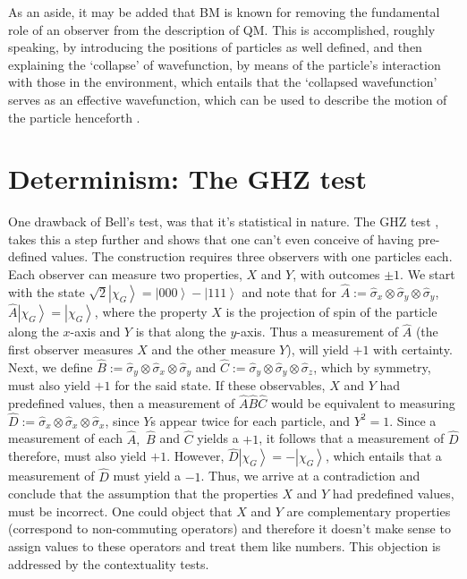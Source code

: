 As an aside, it may be added that BM is known for removing the fundamental
role of an observer from the description of QM. This is accomplished,
roughly speaking, by introducing the positions of particles as well
defined, and then explaining the `collapse' of wavefunction, by means
of the particle's interaction with those in the environment, which
entails that the `collapsed wavefunction' serves as an effective wavefunction,
which can be used to describe the motion of the particle henceforth
\cite{Bohm2,Detlef}.


\section{Determinism: The GHZ test\label{sec:Determinism-The-GHZ}}

One drawback of Bell's test, was that it's statistical in nature.
The GHZ test \cite{GHZ}, takes this a step further and shows that
one can't even conceive of having pre-defined values. The construction
requires three observers with one particles each. Each observer can
measure two properties, $X$ and $Y$, with outcomes $\pm1$. We start
with the state $\sqrt{2}\left|\chi_{G}\right\rangle =\left|000\right\rangle -\left|111\right\rangle $
and note that for $\hat{A}:=\hat{\sigma}_{x}\otimes\hat{\sigma}_{y}\otimes\hat{\sigma}_{y}$,
$\hat{A}\left|\chi_{G}\right\rangle =\left|\chi_{G}\right\rangle $,
where the property $X$ is the projection of spin of the particle
along the $x$-axis and $Y$ is that along the $y$-axis. Thus a measurement
of $\hat{A}$ (the first observer measures $X$ and the other measure
$Y$), will yield $+1$ with certainty. Next, we define $\hat{B}:=\hat{\sigma}_{y}\otimes\hat{\sigma}_{x}\otimes\hat{\sigma}_{y}$
and $\hat{C}:=\hat{\sigma}_{y}\otimes\hat{\sigma}_{y}\otimes\hat{\sigma}_{z}$,
which by symmetry, must also yield $+1$ for the said state. If these
observables, $X$ and $Y$ had predefined values, then a measurement
of $\hat{A}\hat{B}\hat{C}$ would be equivalent to measuring $\hat{D}:=\hat{\sigma}_{x}\otimes\hat{\sigma}_{x}\otimes\hat{\sigma}_{x}$,
since $Y$s appear twice for each particle, and $Y^{2}=1$. Since
a measurement of each $\hat{A},$ $\hat{B}$ and $\hat{C}$ yields
a $+1$, it follows that a measurement of $\hat{D}$ therefore, must
also yield $+1$. However, $\hat{D}\left|\chi_{G}\right\rangle =-\left|\chi_{G}\right\rangle $,
which entails that a measurement of $\hat{D}$ must yield a $-1$.
Thus, we arrive at a contradiction and conclude that the assumption
that the properties $X$ and $Y$ had predefined values, must be incorrect.
One could object that $X$ and $Y$ are complementary properties (correspond
to non-commuting operators) and therefore it doesn't make sense to
assign values to these operators and treat them like numbers. This
objection is addressed by the contextuality tests.


